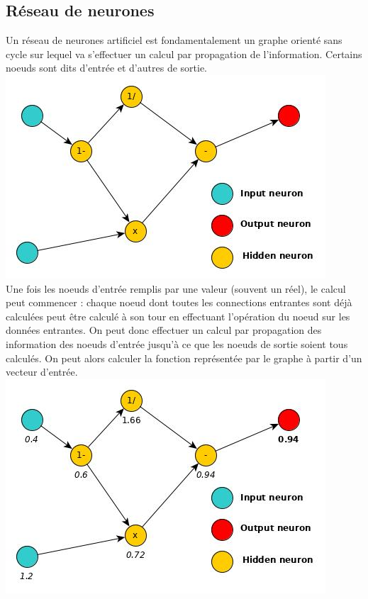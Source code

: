 \documentclass[10pt]{article}
\begin{document}
\subsection{Réseau de neurones}
Un réseau de neurones artificiel est fondamentalement un graphe orienté sans cycle sur lequel va s'effectuer un calcul par propagation de l'information. Certains noeuds sont dits d'entrée et d'autres de sortie. \\
\includegraphics[scale=0.45]{ex_neuron.jpg}\\
Une fois les noeuds d'entrée remplis par une valeur (souvent un réel), le calcul peut commencer : chaque noeud dont toutes les connections entrantes sont déjà calculées peut être calculé à son tour en effectuant l'opération du noeud sur les données entrantes. On peut donc effectuer un calcul par propagation des information des noeuds d'entrée jusqu'à ce que les noeuds de sortie soient tous calculés. On peut alors calculer la fonction représentée par le graphe à partir d'un vecteur d'entrée.\\
\includegraphics[scale=0.45]{ex_computation_neuron.jpg}\\
\end{document}
